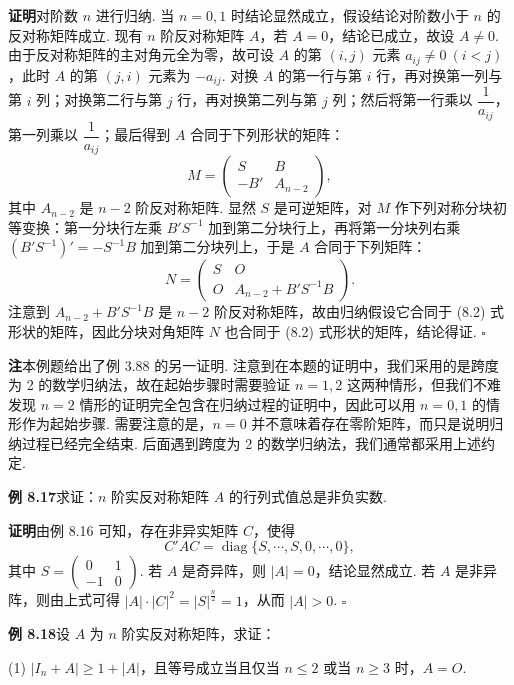 \documentclass[UTF8, 12pt, fontset=fandol, oneside]{ctexart}
\begin{document}
\noindent\textbf{证明}\quad 对阶数 $n$ 进行归纳. 当 $n=0,1$ 时结论显然成立，假设结论对阶数小于 $n$ 的反对称矩阵成立. 现有 $n$ 阶反对称矩阵 $A$，若 $A=0$，结论已成立，故设 $A\ne 0$. 由于反对称矩阵的主对角元全为零，故可设 $A$ 的第 $(i,j)$ 元素 $a_{ij}\ne 0\ (i<j)$，此时 $A$ 的第 $(j,i)$ 元素为 $-a_{ij}$. 对换 $A$ 的第一行与第 $i$ 行，再对换第一列与第 $i$ 列；对换第二行与第 $j$ 行，再对换第二列与第 $j$ 列；然后将第一行乘以 $\dfrac1{a_{ij}}$，第一列乘以 $\dfrac1{a_{ij}}$；最后得到 $A$ 合同于下列形状的矩阵：
\[
M=\left(\begin{array}{cc}
S & B\\
-B' & A_{n-2}
\end{array}\right),
\]
其中 $A_{n-2}$ 是 $n-2$ 阶反对称矩阵. 显然 $S$ 是可逆矩阵，对 $M$ 作下列对称分块初等变换：第一分块行左乘 $B'S^{-1}$ 加到第二分块行上，再将第一分块列右乘 $(B'S^{-1})'=-S^{-1}B$ 加到第二分块列上，于是 $A$ 合同于下列矩阵：
\[
N=\left(\begin{array}{cc}
S & O\\
O & A_{n-2}+B'S^{-1}B
\end{array}\right).
\]
注意到 $A_{n-2}+B'S^{-1}B$ 是 $n-2$ 阶反对称矩阵，故由归纳假设它合同于 (8.2) 式形状的矩阵，因此分块对角矩阵 $N$ 也合同于 (8.2) 式形状的矩阵，结论得证. $\ensuremath{\square}$

\noindent\textbf{注}\quad 本例题给出了例 3.88 的另一证明. 注意到在本题的证明中，我们采用的是跨度为 2 的数学归纳法，故在起始步骤时需要验证 $n=1,2$ 这两种情形，但我们不难发现 $n=2$ 情形的证明完全包含在归纳过程的证明中，因此可以用 $n=0,1$ 的情形作为起始步骤. 需要注意的是，$n=0$ 并不意味着存在零阶矩阵，而只是说明归纳过程已经完全结束. 后面遇到跨度为 2 的数学归纳法，我们通常都采用上述约定.

\noindent\textbf{例 8.17}\quad 求证：$n$ 阶实反对称矩阵 $A$ 的行列式值总是非负实数.

\noindent\textbf{证明}\quad 由例 8.16 可知，存在非异实矩阵 $C$，使得
\[
C'AC=\operatorname{diag}\{S,\cdots,S,0,\cdots,0\},
\]
其中 $S=\left(\begin{array}{cc}0&1\\ -1&0\end{array}\right)$. 若 $A$ 是奇异阵，则 $|A|=0$，结论显然成立. 若 $A$ 是非异阵，则由上式可得 $|A|\cdot |C|^2=|S|^{\frac n2}=1$，从而 $|A|>0$. $\ensuremath{\square}$

\noindent\textbf{例 8.18}\quad 设 $A$ 为 $n$ 阶实反对称矩阵，求证：

(1) $|I_n+A|\ge 1+|A|$，且等号成立当且仅当 $n\le 2$ 或当 $n\ge 3$ 时，$A=O$.
\end{document}
